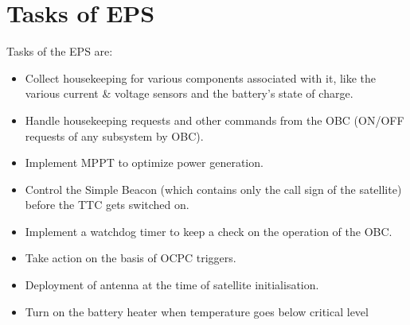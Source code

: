 \section[Tasks of EPS]{Tasks of EPS}
Tasks of the EPS are:
\begin{itemize}
	\item Collect housekeeping for various components associated with it, like the various
	current \& voltage sensors and the battery’s state of charge.
	\item Handle housekeeping requests and other commands from the OBC (ON/OFF requests of any subsystem by OBC).
	\item  Implement MPPT to optimize power generation.
	\item  Control the Simple Beacon (which contains only the call sign of the satellite)
	before the TTC gets switched on.
	\item  Implement a watchdog timer to keep a check on the operation of the OBC.
	\item   Take action on the basis of OCPC triggers.
	\item  Deployment of antenna at the time of satellite initialisation.
	\item  Turn on the battery heater when temperature goes below critical level
\end{itemize}